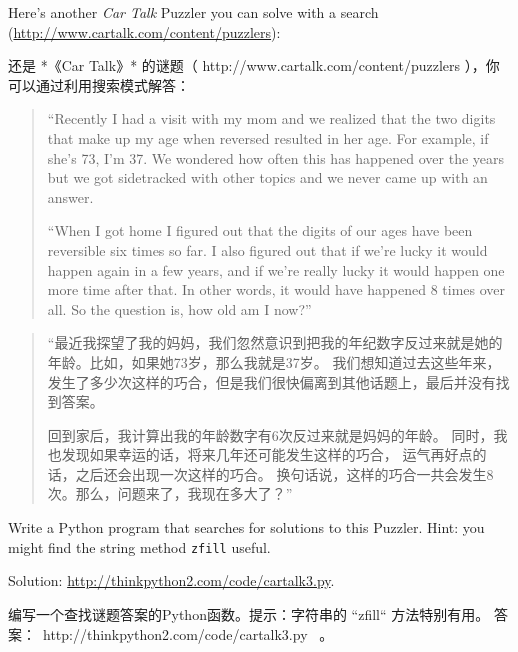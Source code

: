 \begin{exercise}
Here's another {\em Car Talk} Puzzler you can solve with a
search (\url{http://www.cartalk.com/content/puzzlers}):

还是 *《Car Talk》* 的谜题（ http://www.cartalk.com/content/puzzlers ），你可以通过利用搜索模式解答：
    

\begin{quote}
``Recently I had a visit with my mom and we realized that
the two digits that make up my age when reversed resulted in her
age. For example, if she's 73, I'm 37. We wondered how often this has
happened over the years but we got sidetracked with other topics and
we never came up with an answer.

``When I got home I figured out that the digits of our ages have been
reversible six times so far. I also figured out that if we're lucky it
would happen again in a few years, and if we're really lucky it would
happen one more time after that. In other words, it would have
happened 8 times over all. So the question is, how old am I now?''

\end{quote}

\begin{quote}

    “最近我探望了我的妈妈，我们忽然意识到把我的年纪数字反过来就是她的年龄。比如，如果她73岁，那么我就是37岁。
    我们想知道过去这些年来，发生了多少次这样的巧合，但是我们很快偏离到其他话题上，最后并没有找到答案。

    回到家后，我计算出我的年龄数字有6次反过来就是妈妈的年龄。
    同时，我也发现如果幸运的话，将来几年还可能发生这样的巧合，
    运气再好点的话，之后还会出现一次这样的巧合。
    换句话说，这样的巧合一共会发生8次。那么，问题来了，我现在多大了？”

\end{quote}

Write a Python program that searches for solutions to this Puzzler.
Hint: you might find the string method {\tt zfill} useful.

Solution: \url{http://thinkpython2.com/code/cartalk3.py}.

编写一个查找谜题答案的Python函数。提示：字符串的 ``zfill`` 方法特别有用。
答案：\ http://thinkpython2.com/code/cartalk3.py \ 。


\end{exercise}
